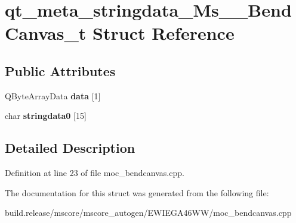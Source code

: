 \hypertarget{structqt__meta__stringdata___ms_____bend_canvas__t}{}\section{qt\+\_\+meta\+\_\+stringdata\+\_\+\+Ms\+\_\+\+\_\+\+Bend\+Canvas\+\_\+t Struct Reference}
\label{structqt__meta__stringdata___ms_____bend_canvas__t}
\subsection*{Public Attributes}
\begin{DoxyCompactItemize}
\item 
\mbox{\label{structqt__meta__stringdata___ms_____bend_canvas__t_acf458ec07c0d5d6f6589f0d25d3e66c7}} 
Q\+Byte\+Array\+Data {\bfseries data} \mbox{[}1\mbox{]}
\item 
\mbox{\label{structqt__meta__stringdata___ms_____bend_canvas__t_a0f69ddf60d302a1d72e2bf37051ec757}} 
char {\bfseries stringdata0} \mbox{[}15\mbox{]}
\end{DoxyCompactItemize}


\subsection{Detailed Description}


Definition at line 23 of file moc\+\_\+bendcanvas.\+cpp.



The documentation for this struct was generated from the following file\+:\begin{DoxyCompactItemize}
\item 
build.\+release/mscore/mscore\+\_\+autogen/\+E\+W\+I\+E\+G\+A46\+W\+W/moc\+\_\+bendcanvas.\+cpp\end{DoxyCompactItemize}
